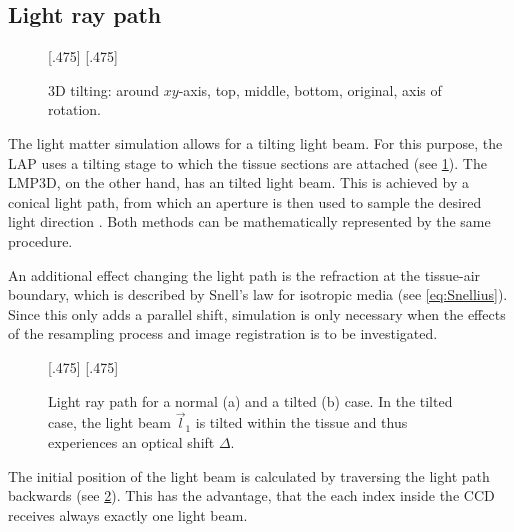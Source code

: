 \subsection{Light ray path}
\label{sec:pathOfLight}
%
\begin{figure}[!t]
\setlength{\tikzheight}{0.42\textwidth}
[.475\textwidth]{}\hfill
{}
[.475\textwidth]{}
\tikzset{external/export=false}
\caption[3D tilting]{3D tilting: around $xy$-axis, \raisebox{.25em}{\tikz \draw[red,thick](0,0)--(0.25,0);} top, \raisebox{.25em}{\tikz \draw[green,thick](0,0)--(0.25,0);} middle, \raisebox{.25em}{\tikz \draw[blue,thick](0,0)--(0.25,0);} bottom, \raisebox{.25em}{\tikz \draw[dash pattern=on 1.25pt off 1.25pt,thick](0,0)--(0.25,0);} original, \raisebox{.25em}{\tikz \draw[gray](0,0)--(0.25,0);} axis of rotation.}
\label{fig:tilting_camera_view}
\end{figure}
%
The light matter simulation allows for a tilting light beam.
For this purpose, the \ac{LAP} uses a tilting stage to which the tissue sections are attached (see \cref{fig:tilting_camera_view}).
The \ac{LMP3D}, on the other hand, has an tilted light beam.
This is achieved by a conical light path, from which an aperture is then used to sample the desired light direction \cite{Wiese:887678}.
Both methods can be mathematically represented by the same procedure.
\par
%
An additional effect changing the light path is the refraction at the tissue-air boundary, which is described by Snell's law for isotropic media (see \cref{eq:Snellius}).
Since this only adds a parallel shift, simulation is only necessary when the effects of the resampling process and image registration is to be investigated.
\par
%
\begin{figure}[!t]
\setlength{\tikzwidth}{0.45\textwidth}
[.475\textwidth]{
\def\tilt{0}
\def\nindex{2.25}
}\hfill
{}[.475\textwidth]{
}
\caption[Light path]{Light ray path for a normal (a) and a tilted (b) case. In the tilted case, the light beam $\vec{l}_1$ is tilted within the tissue and thus experiences an optical shift $\Delta$.}
\label{fig:tilted_side_view}
\end{figure}
%
The initial position of the light beam is calculated by traversing the light path backwards (see \cref{fig:tilted_side_view}).
This has the advantage, that the each index inside the \ac{CCD} receives always exactly one light beam.

